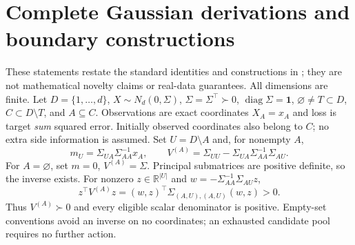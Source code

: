 \documentclass{article}
\newcommand{\R}{\mathbb{R}}
\DeclareRobustCommand{\artifact}[1]{\path{#1}}
\begin{document}
\label{maintextend}
\clearpage


\clearpage
\appendix

\section{Complete Gaussian derivations and boundary constructions}\label{app:proofs}
These statements restate the standard identities and constructions in \artifact{theory.md}; they are not mathematical novelty claims or real-data guarantees. All dimensions are finite. Let $D=\{1,\ldots,d\}$, $X\sim N_d(0,\Sigma)$, $\Sigma=\Sigma^\top\succ0$, $\operatorname{diag}\Sigma=\mathbf1$, $\varnothing\ne T\subset D$, $C\subset D\setminus T$, and $A\subseteq C$. Observations are exact coordinates $X_A=x_A$ and loss is target \emph{sum} squared error. Initially observed coordinates also belong to $C$; no extra side information is assumed. Set $U=D\setminus A$ and, for nonempty $A$,
\begin{equation}
 m_U=\Sigma_{UA}\Sigma_{AA}^{-1}x_A,\qquad
 V^{(A)}=\Sigma_{UU}-\Sigma_{UA}\Sigma_{AA}^{-1}\Sigma_{AU}.
 \label{eq:schur}
\end{equation}
For $A=\varnothing$, set $m=0$, $V^{(A)}=\Sigma$. Principal submatrices are positive definite, so the inverse exists. For nonzero $z\in\R^{|U|}$ and $w=-\Sigma_{AA}^{-1}\Sigma_{AU}z$,
\begin{equation}
 z^\top V^{(A)}z=(w,z)^\top\Sigma_{(A,U),(A,U)}(w,z)>0.
 \label{eq:pd}
\end{equation}
Thus $V^{(A)}\succ0$ and every eligible scalar denominator is positive. Empty-set conventions avoid an inverse on no coordinates; an exhausted candidate pool requires no further action.
\end{document}
